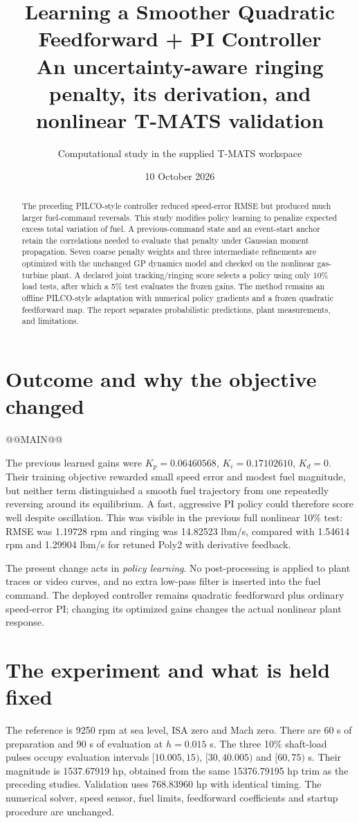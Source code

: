 \documentclass[11pt,a4paper]{article}
\title{Learning a Smoother Quadratic Feedforward + PI Controller\\\large An uncertainty-aware ringing penalty, its derivation, and nonlinear T-MATS validation}
\author{Computational study in the supplied T-MATS workspace}\date{10 October 2026}
\begin{document}
\maketitle
\begin{abstract}
The preceding PILCO-style controller reduced speed-error RMSE but produced much larger fuel-command reversals. This study modifies policy learning to penalize expected excess total variation of fuel. A previous-command state and an event-start anchor retain the correlations needed to evaluate that penalty under Gaussian moment propagation. Seven coarse penalty weights and three intermediate refinements are optimized with the unchanged GP dynamics model and checked on the nonlinear gas-turbine plant. A declared joint tracking/ringing score selects a policy using only 10\% load tests, after which a 5\% test evaluates the frozen gains. The method remains an offline PILCO-style adaptation with numerical policy gradients and a frozen quadratic feedforward map. The report separates probabilistic predictions, plant measurements, and limitations.
\end{abstract}
\section{Outcome and why the objective changed}
@@MAIN@@

The previous learned gains were $K_p=0.06460568$, $K_i=0.17102610$, $K_d=0$. Their training objective rewarded small speed error and modest fuel magnitude, but neither term distinguished a smooth fuel trajectory from one repeatedly reversing around its equilibrium. A fast, aggressive PI policy could therefore score well despite oscillation. This was visible in the previous full nonlinear 10\% test: RMSE was 1.19728 rpm and ringing was 14.82523 lbm/s, compared with 1.54614 rpm and 1.29904 lbm/s for retuned Poly2 with derivative feedback.

The present change acts in \emph{policy learning}. No post-processing is applied to plant traces or video curves, and no extra low-pass filter is inserted into the fuel command. The deployed controller remains quadratic feedforward plus ordinary speed-error PI; changing its optimized gains changes the actual nonlinear plant response.

\section{The experiment and what is held fixed}
The reference is 9250 rpm at sea level, ISA zero and Mach zero. There are 60 s of preparation and 90 s of evaluation at $h=0.015$ s. The three 10\% shaft-load pulses occupy evaluation intervals $[10.005,15)$, $[30,40.005)$ and $[60,75)$ s. Their magnitude is 1537.67919 hp, obtained from the same 15376.79195 hp trim as the preceding studies. Validation uses 768.83960 hp with identical timing. The numerical solver, speed sensor, fuel limits, feedforward coefficients and startup procedure are unchanged.
\end{document}
